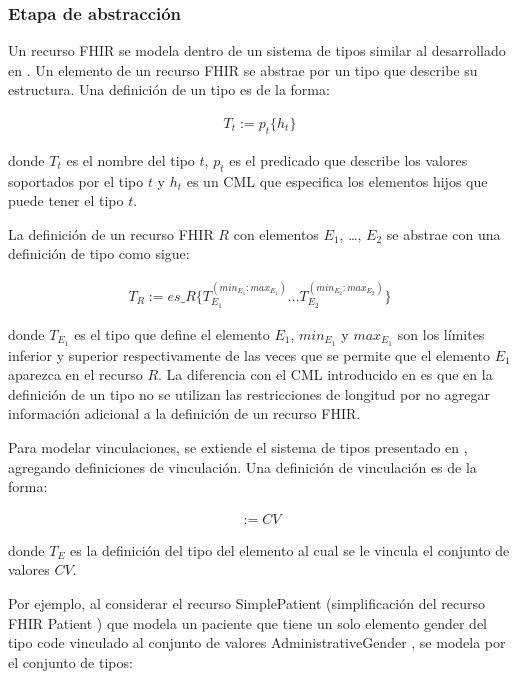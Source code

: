 \subsubsection{Etapa de abstracción}

Un recurso FHIR se modela dentro de un sistema de tipos similar al desarrollado en \cite{Maldonado09}. Un elemento de un recurso FHIR se abstrae por un tipo que describe su estructura. Una definición de un tipo es de la forma:

\begin{align*}
T_t:=p_t\{h_t\}
\end{align*}

\noindent
donde \(T_t\) es el nombre del tipo \(t\), \(p_t\) es el predicado que describe los valores soportados por el tipo \(t\) y \(h_t\) es un CML que especifica los elementos hijos que puede tener el tipo \(t\).

La definición de un recurso FHIR \(R\) con elementos \(E_1\), \dots , \(E_2\) se abstrae con una definición de tipo como sigue:

\begin{align*}
T_R:=es\_R\{T_{E_1}^{(min_{E_1} \colon max_{E_1})} \dots T_{E_2}^{(min_{E_2} \colon max_{E_2})}\}
\end{align*}

\noindent
donde \(T_{E_1}\) es el tipo que define el elemento \(E_1\), \(min_{E_1}\) y \(max_{E_1}\) son los límites inferior y superior respectivamente de las veces que se permite que el elemento \(E_1\) aparezca en el recurso \(R\). La diferencia con el CML introducido en \cite{Maldonado09} es que en la definición de un tipo no se utilizan las restricciones de longitud por no agregar información adicional a la definición de un recurso FHIR.

Para modelar vinculaciones, se extiende el sistema de tipos presentado en \cite{Maldonado09}, agregando definiciones de vinculación. Una definición de vinculación es de la forma:

\begin{align*}
[T_E] := CV
\end{align*}

\noindent
donde \(T_E\) es la definición del tipo del elemento al cual se le vincula el conjunto de valores \(CV\).

Por ejemplo, al considerar el recurso SimplePatient (simplificación del recurso FHIR Patient \cite{FHIRPatient}) que modela un paciente que tiene un solo elemento gender del tipo code \cite{FHIRDataTypes} vinculado al conjunto de valores AdministrativeGender \cite{FHIRAdministrativeGender}, se modela por el conjunto de tipos:

